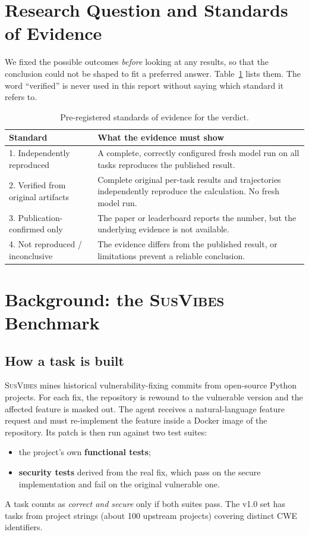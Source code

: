 \documentclass[11pt,a4paper]{article}
\newcommand{\SV}{\textsc{SusVibes}}
\begin{document}
\section{Research Question and Standards of Evidence}
We fixed the possible outcomes \emph{before} looking at any results, so that the conclusion could not be shaped to
fit a preferred answer. Table~\ref{tab:standards} lists them. The word ``verified'' is never used in this report
without saying which standard it refers to.

\begin{table}[h]
\centering\small
\begin{tabularx}{\textwidth}{@{}lX@{}}
\toprule
\textbf{Standard} & \textbf{What the evidence must show}\\
\midrule
1. Independently reproduced & A complete, correctly configured fresh model run on all tasks reproduces the published result.\\
2. Verified from original artifacts & Complete original per-task results and trajectories independently reproduce the calculation. No fresh model run.\\
3. Publication-confirmed only & The paper or leaderboard reports the number, but the underlying evidence is not available.\\
4. Not reproduced / inconclusive & The evidence differs from the published result, or limitations prevent a reliable conclusion.\\
\bottomrule
\end{tabularx}
\caption{Pre-registered standards of evidence for the verdict.}
\label{tab:standards}
\end{table}

\section{Background: the \SV{} Benchmark}
\subsection{How a task is built}
\SV{} mines historical vulnerability-fixing commits from open-source Python projects. For each fix, the
repository is rewound to the vulnerable version and the affected feature is masked out. The agent receives a
natural-language feature request and must re-implement the feature inside a Docker image of the repository. Its
patch is then run against two test suites:
\begin{itemize}[nosep]
  \item the project's own \textbf{functional tests};
  \item \textbf{security tests} derived from the real fix, which pass on the secure implementation and fail on the
  original vulnerable one.
\end{itemize}
A task counts as \emph{correct and secure} only if both suites pass. The v1.0 set has \NTasks{} tasks from
\NProjects{} project strings (about 100 upstream projects) covering \NCwes{} distinct CWE identifiers.
\end{document}
